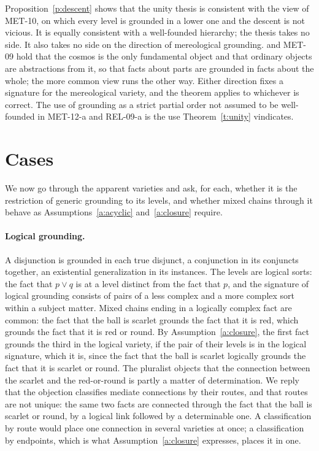 \documentclass{situationist-preprint}
\begin{document}
Proposition~\ref{p:descent} shows that the unity thesis is consistent with the view of MET-10, on which every level is grounded in a lower one and the descent is not vicious. It is equally consistent with a well-founded hierarchy; the thesis takes no side. It also takes no side on the direction of mereological grounding. \citet{Schaffer2009} and MET-09 hold that the cosmos is the only fundamental object and that ordinary objects are abstractions from it, so that facts about parts are grounded in facts about the whole; the more common view runs the other way. Either direction fixes a signature for the mereological variety, and the theorem applies to whichever is correct. The use of grounding as a strict partial order not assumed to be well-founded in MET-12-a and REL-09-a is the use Theorem~\ref{t:unity} vindicates.

\section{Cases}\label{s:cases}

We now go through the apparent varieties and ask, for each, whether it is the restriction of generic grounding to its levels, and whether mixed chains through it behave as Assumptions~\ref{a:acyclic} and~\ref{a:closure} require.

\paragraph{Logical grounding.} A disjunction is grounded in each true disjunct, a conjunction in its conjuncts together, an existential generalization in its instances. The levels are logical sorts: the fact that $p \vee q$ is at a level distinct from the fact that $p$, and the signature of logical grounding consists of pairs of a less complex and a more complex sort within a subject matter. Mixed chains ending in a logically complex fact are common: the fact that the ball is scarlet grounds the fact that it is red, which grounds the fact that it is red or round. By Assumption~\ref{a:closure}, the first fact grounds the third in the logical variety, if the pair of their levels is in the logical signature, which it is, since the fact that the ball is scarlet logically grounds the fact that it is scarlet or round. The pluralist objects that the connection between the scarlet and the red-or-round is partly a matter of determination. We reply that the objection classifies mediate connections by their routes, and that routes are not unique: the same two facts are connected through the fact that the ball is scarlet or round, by a logical link followed by a determinable one. A classification by route would place one connection in several varieties at once; a classification by endpoints, which is what Assumption~\ref{a:closure} expresses, places it in one.
\end{document}
